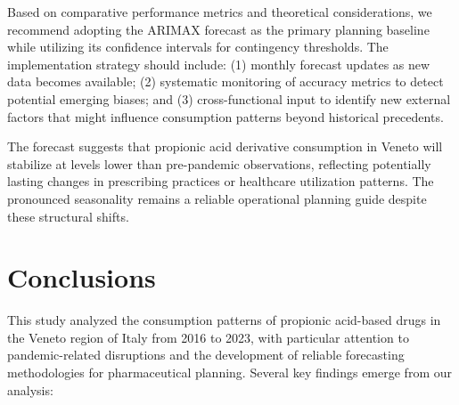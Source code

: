 \documentclass[10pt]{article}
\begin{document}
Based on comparative performance metrics and theoretical considerations, we recommend adopting the ARIMAX forecast as the primary planning baseline while utilizing its confidence intervals for contingency thresholds. The implementation strategy should include: (1) monthly forecast updates as new data becomes available; (2) systematic monitoring of accuracy metrics to detect potential emerging biases; and (3) cross-functional input to identify new external factors that might influence consumption patterns beyond historical precedents.

The forecast suggests that propionic acid derivative consumption in Veneto will stabilize at levels lower than pre-pandemic observations, reflecting potentially lasting changes in prescribing practices or healthcare utilization patterns. The pronounced seasonality remains a reliable operational planning guide despite these structural shifts.

\section{Conclusions}

This study analyzed the consumption patterns of propionic acid-based drugs in the Veneto region of Italy from 2016 to 2023, with particular attention to pandemic-related disruptions and the development of reliable forecasting methodologies for pharmaceutical planning. Several key findings emerge from our analysis:
\end{document}

